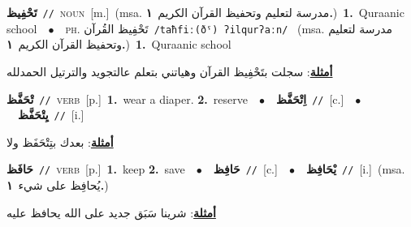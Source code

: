 \documentclass[10pt,a4paper,twoside]{article} %
\begin{document}
\begin{multicols}{2}
{\setlength\topsep{0pt}\textbf{\foreignlanguage{arabic}{تَحْفِيظ}}\ {\color{gray}\texttt{//}\color{black}}\ \textsc{noun}\ [m.]\ \color{gray}(msa. \foreignlanguage{arabic}{مدرسة لتعليم وتحفيظ القرآن الكريم}~\foreignlanguage{arabic}{\textbf{١.}})\color{black}\ \textbf{1.}~Quraanic school\ \ $\bullet$\ \ \textsc{ph.} \color{gray} \foreignlanguage{arabic}{تَحْفِيظ القُرآن}\color{black}\ {\color{gray}\texttt{/{\sffamily taħfiː(ðˤ) ʔilqurʔaːn}/}\color{black}}\ \color{gray} (msa. \foreignlanguage{arabic}{مدرسة لتعليم وتحفيظ القرآن الكريم}~\foreignlanguage{arabic}{\textbf{١.}})\color{black}\ \textbf{1.}~Quraanic school\  \begin{flushright}\color{gray}\foreignlanguage{arabic}{\textbf{\underline{\foreignlanguage{arabic}{أمثلة}}}: سجلت بتَحْفِيظ القرآن وهياتني بتعلم عالتجويد والترتيل الحمدلله}\end{flushright}\color{black}} \vspace{2mm}

{\setlength\topsep{0pt}\textbf{\foreignlanguage{arabic}{تْحَفَّظ}}\ {\color{gray}\texttt{//}\color{black}}\ \textsc{verb}\ [p.]\ \textbf{1.}~wear a diaper.  \textbf{2.}~reserve\ \ $\bullet$\ \ \setlength\topsep{0pt}\textbf{\foreignlanguage{arabic}{اِتْحَفَّظ}}\ {\color{gray}\texttt{//}\color{black}}\ [c.]\ \ $\bullet$\ \ \setlength\topsep{0pt}\textbf{\foreignlanguage{arabic}{يِتْحَفَّظ}}\ {\color{gray}\texttt{//}\color{black}}\ [i.]\  \begin{flushright}\color{gray}\foreignlanguage{arabic}{\textbf{\underline{\foreignlanguage{arabic}{أمثلة}}}: بعدك بتِتْحَفَظ ولا}\end{flushright}\color{black}} \vspace{2mm}

{\setlength\topsep{0pt}\textbf{\foreignlanguage{arabic}{حَافَظ}}\ {\color{gray}\texttt{//}\color{black}}\ \textsc{verb}\ [p.]\ \textbf{1.}~keep  \textbf{2.}~save\ \ $\bullet$\ \ \setlength\topsep{0pt}\textbf{\foreignlanguage{arabic}{حَافِظ}}\ {\color{gray}\texttt{//}\color{black}}\ [c.]\ \ $\bullet$\ \ \setlength\topsep{0pt}\textbf{\foreignlanguage{arabic}{يْحَافِظ}}\ {\color{gray}\texttt{//}\color{black}}\ [i.]\ \color{gray}(msa. \foreignlanguage{arabic}{يُحافِظ على شيء}~\foreignlanguage{arabic}{\textbf{١.}})\color{black}\  \begin{flushright}\color{gray}\foreignlanguage{arabic}{\textbf{\underline{\foreignlanguage{arabic}{أمثلة}}}: شرينا سَبَق جديد على الله يحافظ عليه}\end{flushright}\color{black}} \vspace{2mm}


\end{multicols}
\end{document}
